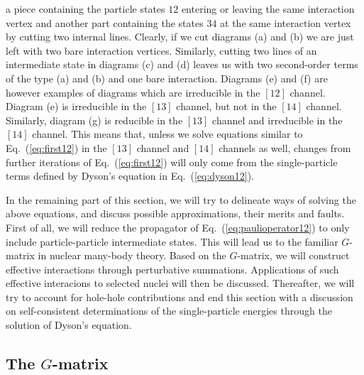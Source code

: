 a piece containing the particle states $12$  entering or leaving 
the same interaction vertex 
and another   part containing the states $34$ at the same interaction
vertex by cutting two internal lines.
Clearly, if we cut diagrams (a) and (b) we are just left with two bare 
interaction vertices. Similarly, cutting two lines of an intermediate 
state in diagrams (c) and (d) leaves us with two second-order terms
of the type (a) and (b) and one bare interaction. 
Diagrams (e) and (f) are however examples of diagrams which are
irreducible in the $[12]$ channel. Diagram (e) is 
irreducible in the $[13]$ channel, but not in the $[14]$ channel.
Similarly, diagram (g) is reducible in the $[13]$ channel and
irreducible in the $[14]$ channel. 
This means that, unless we solve equations similar to Eq.\ (\ref{eq:first12})
in the $[13]$ channel and $[14]$ channels as well, changes 
from further iterations
of Eq.\ (\ref{eq:first12}) will only come from 
the single-particle terms defined
by Dyson's equation in Eq.\ (\ref{eq:dyson12}).

In the remaining part of this section, we will try to delineate ways 
of solving the above equations, and discuss possible approximations,
their merits and faults. First of all, we will reduce
the propagator of  Eq.\ (\ref{eq:paulioperator12}) to only include
particle-particle intermediate states. This will lead us to the familiar
$G$-matrix in nuclear many-body theory. 
Based on the $G$-matrix, we will construct effective interactions
through perturbative summations. Applications of such 
effective interacions to selected nuclei will then be discussed.
Thereafter, we will try to
account for hole-hole contributions and end this section with a 
discussion on self-consistent determinations of the single-particle 
energies through the solution of Dyson's equation.
 
\subsection{The $G$-matrix}

